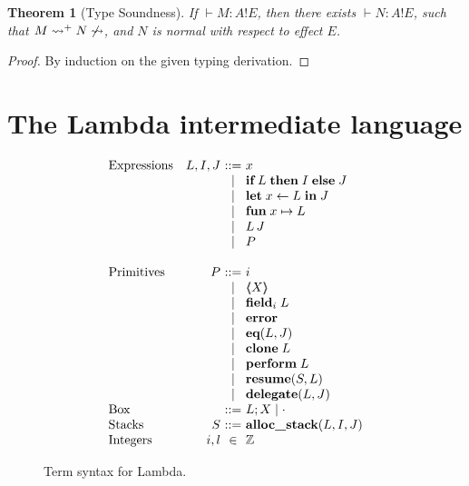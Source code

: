 \documentclass[12pt,mscres,cdtppar,twoside,openright,logo,rightchapter,normalheadings]{infthesis}
\makeatletter
\newtheorem{theorem}{Theorem}[section]
\theoremstyle{definition}
\newcommand{\slab}[1]{\textrm{#1}}
\newcommand{\revto}{\ensuremath{\leftarrow}}
\newcommand{\keyw}[1]{\textbf{#1}}
\newcommand{\Let}{\keyw{let}}
\newcommand{\In}{\keyw{in}}
\newcommand{\eff}{!}
\newcommand{\typc}[3]{#1 \vdash #2 \eff #3}
\newcommand{\reducesto}[0]{\ensuremath{\leadsto}}
\newcommand{\ba}{\begin{array}}
\newcommand{\ea}{\end{array}}
\newenvironment{syntax}{\[\ba{@{}l@{\quad}r@{~}c@{~}l@{}}}{\ea\]\ignorespacesafterend}
\makeatother
\begin{document}
\begin{theorem}[Type Soundness]
If $\typc{}{M : A}{E}$, then there exists $\typc{}{N : A}{E}$, such that
$M \reducesto^+ N \not\reducesto$, and $N$ is normal with respect to
effect $E$.
\end{theorem}
\begin{proof}
By induction on the given typing derivation.
\end{proof}

\section{The Lambda intermediate language}
\label{sec:lambda}

\newcommand{\If}{\keyw{if}}
\newcommand{\Then}{\keyw{then}}
\newcommand{\Else}{\keyw{else}}
\newcommand{\Fun}{\keyw{fun}}
\newcommand{\Perform}{\keyw{perform}}
\newcommand{\Resume}{\keyw{resume}}
\newcommand{\Clone}{\keyw{clone}}
\newcommand{\Makeblock}{\keyw{makeblock}}
\newcommand{\Field}{\keyw{field}}
\newcommand{\Eq}{\keyw{eq}}
\newcommand{\Alloc}{\keyw{alloc\_stack}}
\newcommand{\Error}{\keyw{error}}
\newcommand{\Delegate}{\keyw{delegate}}

\newcommand{\LBox}[1]{\langle\!\!\langle #1 \rangle\!\!\rangle}

\begin{figure}
\begin{syntax}
\slab{Expressions}   &L,I,J  &::= & x\\
                     &     &\mid& \If \; L \; \Then \; I \; \Else \; J\\
                     &     &\mid& \Let \; x \revto L \; \In \; J\\
                     &     &\mid& \Fun \; x \mapsto L \\
                     &     &\mid& L\,J\\
                     &     &\mid& P\\
                     &     &    &\\
\slab{Primitives}    &P    &::= & i\\
                     &     &\mid& \LBox{X}\\
                     &     &\mid& \Field_i\; L\\
                     &     &\mid& \Error\\
                     &     &\mid& \Eq(L,J)\\
                     &     &\mid& \Clone \; L\\
                     &     &\mid& \Perform \; L \\
                     &     &\mid& \Resume(S,L) \\
                     &     &\mid& \Delegate(L,J)\\
\slab{Box}           &     &::= & L;X \mid \cdot\\
\slab{Stacks}        &S    &::= & \Alloc (L,I,J)\\
\slab{Integers}      &i,l  &\in & \mathbb{Z} 
\end{syntax}
\caption{Term syntax for Lambda.}\label{fig:lambda-terms}
\end{figure}
\end{document}
